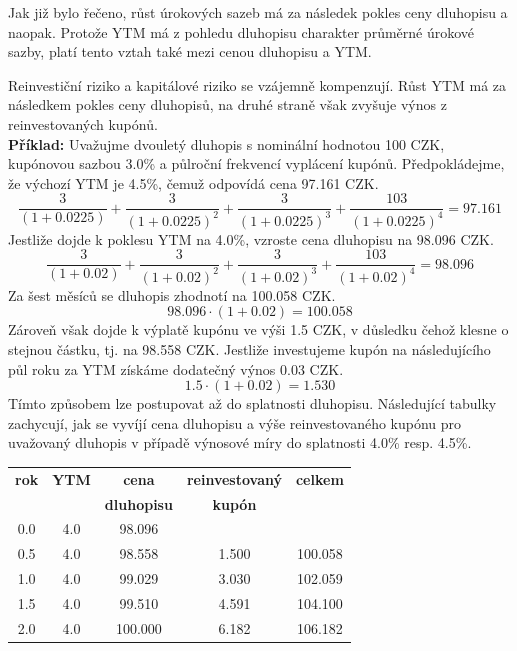 \documentclass[a4paper]{book}
\begin{document}
Jak již bylo řečeno, růst úrokových sazeb má za následek pokles ceny dluhopisu a naopak. Protože YTM má z pohledu dluhopisu charakter průměrné úrokové sazby, platí tento vztah také mezi cenou dluhopisu a YTM.

Reinvestiční riziko a kapitálové riziko se vzájemně kompenzují. Růst YTM má za následkem pokles ceny dluhopisů, na druhé straně však zvyšuje výnos z reinvestovaných kupónů.\\

\noindent \textbf{Příklad:} Uvažujme dvouletý dluhopis s nominální hodnotou 100 CZK, kupónovou sazbou 3.0\% a půlroční frekvencí vyplácení kupónů. Předpokládejme, že výchozí YTM je 4.5\%, čemuž odpovídá cena 97.161 CZK.
\begin{equation*}
\frac{3}{(1 + 0.0225)} + \frac{3}{(1 + 0.0225)^2} + \frac{3}{(1 + 0.0225)^3} + \frac{103}{(1 + 0.0225)^4} = 97.161
\end{equation*}
Jestliže dojde k poklesu YTM na 4.0\%, vzroste cena dluhopisu na 98.096 CZK.
\begin{equation*}
\frac{3}{(1 + 0.02)} + \frac{3}{(1 + 0.02)^2} + \frac{3}{(1 + 0.02)^3} + \frac{103}{(1 + 0.02)^4} = 98.096
\end{equation*}
Za šest měsíců se dluhopis zhodnotí na 100.058 CZK.
\begin{equation*}
98.096 \cdot (1 + 0.02) = 100.058
\end{equation*}
Zároveň však dojde k výplatě kupónu ve výši 1.5 CZK, v důsledku čehož klesne o stejnou částku, tj. na 98.558 CZK. Jestliže investujeme kupón na následujícího půl roku za YTM získáme dodatečný výnos 0.03 CZK.
\begin{equation*}
1.5 \cdot (1 + 0.02) = 1.530
\end{equation*}
Tímto způsobem lze postupovat až do splatnosti dluhopisu. Následující tabulky zachycují, jak se vyvíjí cena dluhopisu a výše reinvestovaného kupónu pro uvažovaný dluhopis v případě výnosové míry do splatnosti 4.0\% resp. 4.5\%. 
\begin{center}
\begin{tabular}{c c c c c}
\textbf{rok} & \textbf{YTM} & \textbf{cena}      & \textbf{reinvestovaný} & \textbf{celkem} \\
             &              & \textbf{dluhopisu} & \textbf{kupón}         &  \\
\hline
0.0 & 4.0 &  98.096 &       &         \\
0.5 & 4.0 &  98.558 & 1.500 & 100.058 \\
1.0 & 4.0 &  99.029 & 3.030 & 102.059 \\
1.5 & 4.0 &  99.510 & 4.591 & 104.100 \\
2.0 & 4.0 & 100.000 & 6.182 & 106.182 \\
\end{tabular}
\end{center}
\end{document}
